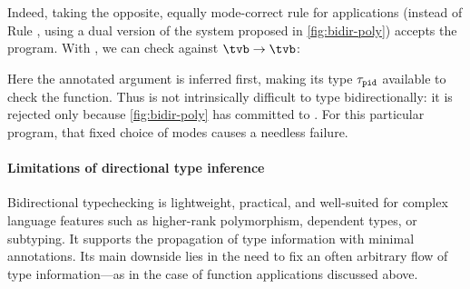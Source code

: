 \documentclass[acmsmall,screen,nonacm%
\Anonymous{,anonymous}{}%
\Final{}{,review}%
]{acmart}
\begin{document}
\begin{example}
Indeed, taking the opposite, equally mode-correct rule  for
applications (instead of Rule , \ie using a dual version
of the system proposed in \cref{fig:bidir-poly}) accepts the program.
%
With , we can check  against $\tvb \to \tvb$:
%
Here the annotated argument  is inferred first, making its type
$\tau_{\texttt{pid}}$ available to check the function.  
%
Thus  is not intrinsically difficult to type bidirectionally: it
is rejected only because \cref{fig:bidir-poly} has committed to
. For this particular program, that fixed choice of  
modes causes a needless failure.
\end{example}





\paragraph{Limitations of directional type inference}

Bidirectional typechecking is lightweight, practical, and well-suited for
complex language features such as higher-rank polymorphism, dependent types,
or subtyping. It supports the propagation of type information with minimal
annotations. Its main downside lies in the need to fix an often arbitrary
flow of type information---as in the case of function applications discussed
above.
\end{document}
